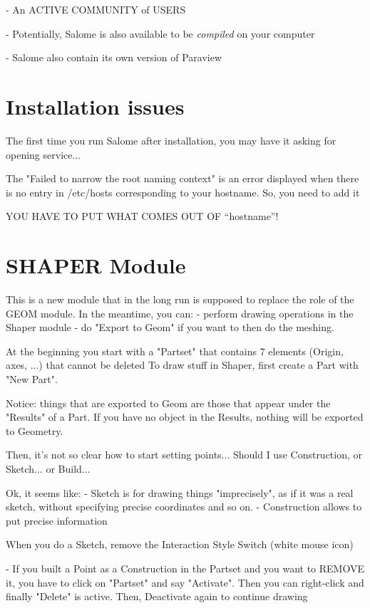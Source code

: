 \documentclass[10pt]{book}
\begin{document}
 - {An ACTIVE COMMUNITY of USERS}

 - Potentially, Salome is also available to be \textit{compiled} on your computer
 
 - Salome also contain its own version of Paraview

\chapter{Installation issues}

  The first time you run Salome after installation,
  you may have it asking for opening service...

The "Failed to narrow the root naming context" 
is an error displayed when there is no entry in /etc/hosts 
corresponding to your hostname. So, you need to add it

YOU HAVE TO PUT WHAT COMES OUT OF ``hostname''!



 \chapter{SHAPER Module}


This is a new module that in the long run is supposed to replace the role of the GEOM module.
In the meantime, you can:
  - perform drawing operations in the Shaper module 
  - do "Export to Geom" if you want to then do the meshing.

At the beginning you start with a "Partset" that contains 7 elements (Origin, axes, ...) that cannot be deleted  
To draw stuff in Shaper, first create a Part with "New Part".

Notice: things that are exported to Geom are those that appear under the "Results" of a Part.
If you have no object in the Results, nothing will be exported to Geometry.

Then, it's not so clear how to start setting points... Should I use Construction, or Sketch... or Build...

Ok, it seems like:
 - Sketch is for drawing things "imprecisely", as if it was a real sketch, without specifying precise coordinates and so on.
 - Construction allows to put precise information

 When you do a Sketch, remove the Interaction Style Switch (white mouse icon)
 
 - If you built a Point as a Construction in the Partset and you want to REMOVE it, you have to click on "Partset" and say "Activate". 
   Then you can right-click and finally "Delete" is active. Then, Deactivate again to continue drawing
\end{document}

